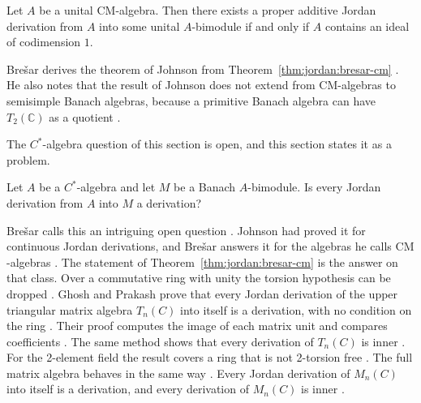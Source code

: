 \begin{theorem}\label{thm:jordan:bresar-cm}
Let $A$ be a unital $\mathrm{CM}$-algebra. Then there exists a proper additive Jordan derivation
from $A$ into some unital $A$-bimodule if and only if $A$ contains an ideal of codimension $1$.
\end{theorem}

Brešar derives the theorem of Johnson from Theorem~\ref{thm:jordan:bresar-cm}
\cite[p.~422]{Bresar2005}. He also notes that the result of Johnson does not extend from
$\mathrm{CM}$-algebras to semisimple Banach algebras, because a primitive Banach algebra can have
$T_2(\mathbb{C})$ as a quotient \cite[p.~422]{Bresar2005}.

The $C^{*}$-algebra question of this section is open, and this section states
it as a problem. %

\begin{problem}\label{prob:open:jordan-cstar}
Let $A$ be a $C^{*}$-algebra and let $M$ be a Banach $A$-bimodule.
Is every Jordan derivation from $A$ into $M$ a derivation?
\end{problem}

Bre\v{s}ar calls this an intriguing open question
\cite[Section~5, p.~421]{Bresar2005}. Johnson had proved it for continuous
Jordan derivations, and Bre\v{s}ar answers it for the algebras he calls
$\mathrm{CM}$-algebras \cite[p.~421]{Bresar2005}. The statement of
Theorem~\ref{thm:jordan:bresar-cm} is the answer on that class.
Over a commutative ring with unity the torsion hypothesis can be dropped
\cite[Theorem~2.1, p.~3]{GhoshPrakash2018}. Ghosh and Prakash prove that every
Jordan derivation of the upper triangular matrix algebra $T_n(C)$ into itself is
a derivation, with no condition on the ring
\cite[Theorem~2.1, p.~3]{GhoshPrakash2018}. Their proof computes the image
of each matrix unit and compares coefficients
\cite[pp.~3--4]{GhoshPrakash2018}. The same method shows that every derivation of
$T_n(C)$ is inner \cite[Theorem~2.2, p.~5]{GhoshPrakash2018}. For the 2-element
field the result covers a ring that is not 2-torsion free
\cite[Corollary~2.1, p.~4]{GhoshPrakash2018}. The full matrix algebra behaves in
the same way \cite[Theorem~3.1, p.~5]{GhoshPrakash2018}. Every Jordan derivation
of $M_n(C)$ into itself is a derivation, and every derivation of $M_n(C)$ is
inner \cite[Theorem~3.2, p.~8]{GhoshPrakash2018}.

